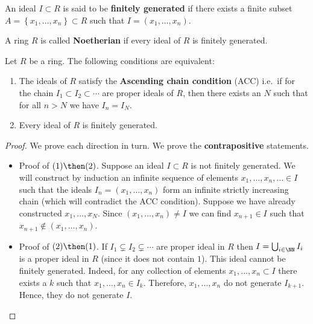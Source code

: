 \documentclass[12pt, a4paper]{article}
\begin{document}
\begin{definition}
    An ideal \(I \subset R\) is said to be \textbf{finitely generated} if there exists a finite subset \(A = \left\{ x_1,\ldots,x_n \right\} \subset R\) such that \(I = (x_1,\ldots,x_n)\).
\end{definition}

\begin{definition}
    A ring \(R\) is called \textbf{Noetherian} if every ideal of \(R\) is finitely generated.
\end{definition}

\begin{mdlemma}
    Let \(R\) be a ring. The following conditions are equivalent:
    \begin{enumerate}
        \item The ideals of \(R\) satisfy the \textbf{Ascending chain condition} (ACC) i.e.\ if for the chain \({I_1 \subset I_2 \subset \cdots}\) are proper ideals of \(R\), then there exists an \(N\) such that for all \(n>N\) we have \(I_n =I_N\).
        \item Every ideal of \(R\) is finitely generated.
    \end{enumerate}
\end{mdlemma}

\begin{proof}
   We prove each direction in turn.  We prove the \textbf{contrapositive} statements.
   \begin{itemize}
    \item Proof of \((1) \then (2)\). Suppose an ideal \(I \subset R\) is not finitely generated. We will construct by induction an infinite sequence of elements \(x_1,\ldots,x_n,\ldots \in I\) such that the ideals \(I_n=(x_1,\ldots,x_n)\) form an infinite strictly increasing chain (which will contradict the ACC condition). Suppose we have already constructed \(x_1,\ldots,x_N\). Since \((x_1,\ldots,x_n) \neq I\) we can find \(x_{n+1} \in I\) such that \(x_{n+1} \not\in (x_1,\ldots,x_n)\).
    \item Proof of \((2)\then (1)\). If \(I_1 \subsetneq I_2 \subsetneq \cdots\) are proper ideal in \(R\) then \(I = \bigcup_{i\in \NN} I_i\) is a proper ideal in \(R\) (since it does not contain \(1\)). This ideal cannot be finitely generated. Indeed, for any collection of elements \(x_1,\ldots,x_n \subset I\) there exists a \(k\) such that \(x_1,\ldots,x_n \in I_k\). Therefore, \(x_1,\ldots,x_n\) do not generate \(I_{k+1}\). Hence, they do not generate \(I\). 
   \end{itemize}
\end{proof}
\end{document}
